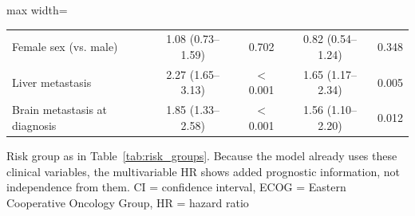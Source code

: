 \documentclass{article}
\begin{document}
\begin{table}[htbp]
\begin{adjustbox}{max width=\textwidth}
\begin{tabular}{@{}l cc cc@{}}
\quad Female sex (vs. male) & 1.08 (0.73--1.59) & 0.702 & 0.82 (0.54--1.24) & 0.348 \\
\quad Liver metastasis & 2.27 (1.65--3.13) & $<$ 0.001 & 1.65 (1.17--2.34) & 0.005 \\
\quad Brain metastasis at diagnosis & 1.85 (1.33--2.58) & $<$ 0.001 & 1.56 (1.10--2.20) & 0.012 \\
\bottomrule
\end{tabular}%
\end{adjustbox}
\par\smallskip
\begin{minipage}{\textwidth}\footnotesize
Risk group as in Table~\ref{tab:risk_groups}. Because the model already uses these clinical variables, the multivariable HR shows added prognostic information, not independence from them. CI = confidence interval, ECOG = Eastern Cooperative Oncology Group, HR = hazard ratio
\end{minipage}
\end{table}
\addtocounter{table}{-1}



\end{document}
